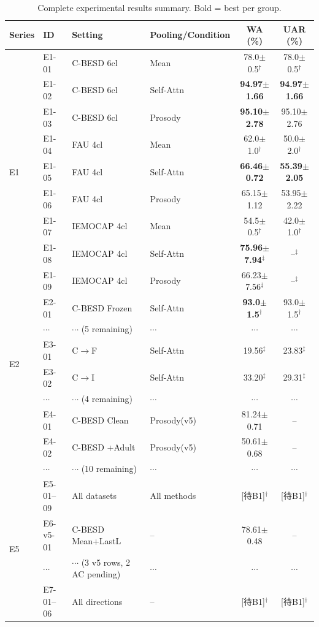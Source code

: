 \begin{table}[p]
\centering
\caption{Complete experimental results summary. Bold = best per group.}
\label{tab:summary}
\small
\begin{tabular}{llllcc}
\toprule
\textbf{Series} & \textbf{ID} & \textbf{Setting} & \textbf{Pooling/Condition} & \textbf{WA (\%)} & \textbf{UAR (\%)} \\
\midrule
\multirow{9}{*}{E1}
& E1-01 & C-BESD 6cl & Mean & 78.0$\pm$0.5$^\dagger$ & 78.0$\pm$0.5$^\dagger$ \\
& E1-02 & C-BESD 6cl & Self-Attn & \textbf{94.97$\pm$1.66} & \textbf{94.97$\pm$1.66} \\
& E1-03 & C-BESD 6cl & Prosody & \textbf{95.10$\pm$2.78} & 95.10$\pm$2.76 \\
& E1-04 & FAU 4cl & Mean & 62.0$\pm$1.0$^\dagger$ & 50.0$\pm$2.0$^\dagger$ \\
& E1-05 & FAU 4cl & Self-Attn & \textbf{66.46$\pm$0.72} & \textbf{55.39$\pm$2.05} \\
& E1-06 & FAU 4cl & Prosody & 65.15$\pm$1.12 & 53.95$\pm$2.22 \\
& E1-07 & IEMOCAP 4cl & Mean & 54.5$\pm$0.5$^\dagger$ & 42.0$\pm$1.0$^\dagger$ \\
& E1-08 & IEMOCAP 4cl & Self-Attn & \textbf{75.96$\pm$7.94}$^\ddagger$ & --$^\ddagger$ \\
& E1-09 & IEMOCAP 4cl & Prosody & 66.23$\pm$7.56$^\ddagger$ & --$^\ddagger$ \\
\midrule
\multirow{6}{*}{E2}
& E2-01 & C-BESD Frozen & Self-Attn & \textbf{93.0$\pm$1.5}$^\dagger$ & 93.0$\pm$1.5$^\dagger$ \\
& $\cdots$ & $\cdots$ (5 remaining) & $\cdots$ & $\cdots$ & $\cdots$ \\
\midrule
\multirow{3}{*}{E3}
& E3-01 & C$\rightarrow$F & Self-Attn & 19.56$^\ddagger$ & 23.83$^\ddagger$ \\
& E3-02 & C$\rightarrow$I & Self-Attn & 33.20$^\ddagger$ & 29.31$^\ddagger$ \\
& $\cdots$ & $\cdots$ (4 remaining) & $\cdots$ & $\cdots$ & $\cdots$ \\
\midrule
\multirow{4}{*}{E4}
& E4-01 & C-BESD Clean & Prosody(v5) & 81.24$\pm$0.71 & -- \\
& E4-02 & C-BESD +Adult & Prosody(v5) & 50.61$\pm$0.68 & -- \\
& $\cdots$ & $\cdots$ (10 remaining) & $\cdots$ & $\cdots$ & $\cdots$ \\
\midrule
\multirow{9}{*}{E5}
& E5-01--09 & All datasets & All methods & [待B1]$^\dagger$ & [待B1]$^\dagger$ \\
\midrule
\multirow{4}{*}{E6}
& E6-v5-01 & C-BESD Mean+LastL & -- & 78.61$\pm$0.48 & -- \\
& $\cdots$ & $\cdots$ (3 v5 rows, 2 AC pending) & $\cdots$ & $\cdots$ & $\cdots$ \\
\midrule
\multirow{6}{*}{E7}
& E7-01--06 & All directions & -- & [待B1]$^\dagger$ & [待B1]$^\dagger$ \\
\bottomrule
\end{tabular}
\end{table}
